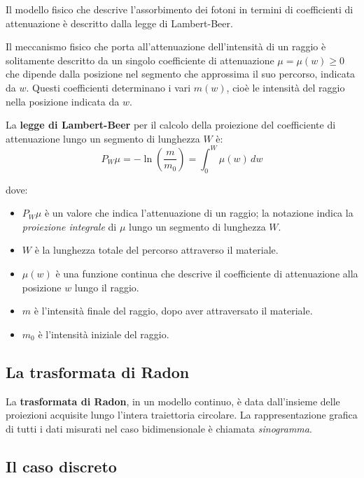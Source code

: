 \documentclass[12pt,a4paper]{report}
\begin{document}
Il modello fisico che descrive l'assorbimento dei fotoni in termini di coefficienti di attenuazione è descritto dalla legge di
Lambert-Beer.

Il meccanismo fisico che porta all'attenuazione dell'intensità di un raggio è solitamente descritto da un singolo coefficiente di
attenuazione \(\mu = \mu(w) \ge 0\) che dipende dalla posizione nel segmento che approssima il suo percorso, indicata da \(w\).
Questi coefficienti determinano i vari \(m(w)\), cioè le intensità del raggio nella posizione indicata da \(w\).

La \textbf{legge di Lambert-Beer} per il calcolo della proiezione del coefficiente di attenuazione lungo un segmento di lunghezza
\(W\) è:
\begin{equation} \label{eq:law_lambert-beer}
  P_W\mu = - \ln{(\frac{m}{m_0})} = \int_0^W \mu(w) \, dw
\end{equation}

dove:
\begin{itemize}
  \item \(P_W\mu\) è un valore che indica l'attenuazione di un raggio; la notazione indica la \textit{proiezione integrale} di
        \(\mu\) lungo un segmento di lunghezza \(W\).
  \item \(W\) è la lunghezza totale del percorso attraverso il materiale.
  \item \(\mu(w)\) è una funzione continua che descrive il coefficiente di attenuazione alla posizione \(w\) lungo il raggio.
  \item \(m\) è l'intensità finale del raggio, dopo aver attraversato il materiale.
  \item \(m_0\) è l'intensità iniziale del raggio.
\end{itemize}

\subsection{La trasformata di Radon}

La \textbf{trasformata di Radon}, in un modello continuo, è data dall'insieme delle proiezioni acquisite lungo l'intera
traiettoria circolare.
La rappresentazione grafica di tutti i dati misurati nel caso bidimensionale è chiamata \textit{sinogramma}.

\subsection{Il caso discreto}
\end{document}

